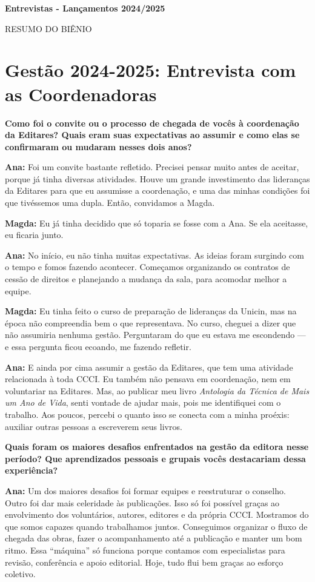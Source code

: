 \documentclass[
]{article}
\begin{document}
\textbf{Entrevistas - Lançamentos 2024/2025}

RESUMO DO BIÊNIO

\section{Gestão 2024-2025: Entrevista com as Coordenadoras}\label{gestuxe3o-2024-2025-entrevista-com-as-coordenadoras}

\textbf{Como foi o convite ou o processo de chegada de vocês à coordenação da Editares? Quais eram suas expectativas ao assumir e como elas se confirmaram ou mudaram nesses dois anos?}

\textbf{Ana:} Foi um convite bastante refletido. Precisei pensar muito antes de aceitar, porque já tinha diversas atividades. Houve um grande investimento das lideranças da Editares para que eu assumisse a coordenação, e uma das minhas condições foi que tivéssemos uma dupla. Então, convidamos a Magda.

\textbf{Magda:} Eu já tinha decidido que só toparia se fosse com a Ana. Se ela aceitasse, eu ficaria junto.

\textbf{Ana:} No início, eu não tinha muitas expectativas. As ideias foram surgindo com o tempo e fomos fazendo acontecer. Começamos organizando os contratos de cessão de direitos e planejando a mudança da sala, para acomodar melhor a equipe.

\textbf{Magda:} Eu tinha feito o curso de preparação de lideranças da Unicin, mas na época não compreendia bem o que representava. No curso, cheguei a dizer que não assumiria nenhuma gestão. Perguntaram do que eu estava me escondendo --- e essa pergunta ficou ecoando, me fazendo refletir.

\textbf{Ana:} E ainda por cima assumir a gestão da Editares, que tem uma atividade relacionada à toda CCCI. Eu também não pensava em coordenação, nem em voluntariar na Editares. Mas, ao publicar meu livro \emph{Antologia da Técnica de Mais um Ano de Vida}, senti vontade de ajudar mais, pois me identifiquei com o trabalho. Aos poucos, percebi o quanto isso se conecta com a minha proéxis: auxiliar outras pessoas a escreverem seus livros.

\textbf{Quais foram os maiores desafios enfrentados na gestão da editora nesse período? Que aprendizados pessoais e grupais vocês destacariam dessa experiência?}

\textbf{Ana:} Um dos maiores desafios foi formar equipes e reestruturar o conselho. Outro foi dar mais celeridade às publicações. Isso só foi possível graças ao envolvimento dos voluntários, autores, editores e da própria CCCI. Mostramos do que somos capazes quando trabalhamos juntos. Conseguimos organizar o fluxo de chegada das obras, fazer o acompanhamento até a publicação e manter um bom ritmo. Essa ``máquina'' só funciona porque contamos com especialistas para revisão, conferência e apoio editorial. Hoje, tudo flui bem graças ao esforço coletivo.
\end{document}
